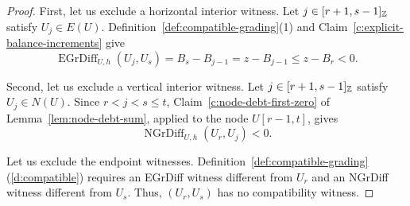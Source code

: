 \begin{proof}
First, let us exclude a horizontal interior witness.
Let $j\in[r+1,s-1]_{\mathbb Z}$ satisfy $U_j\in E(U)$.
Definition~\ref{def:compatible-grading}(1) and Claim~\ref{c:explicit-balance-increments} give
\[
 \operatorname{EGrDiff}_{U,h}(U_j,U_s)
 =B_s-B_{j-1}=z-B_{j-1}\le z-B_r<0.
\]

Second, let us exclude a vertical interior witness.
Let $j\in[r+1,s-1]_{\mathbb Z}$ satisfy $U_j\in N(U)$.
Since $r<j<s\le t$, Claim~\ref{c:node-debt-first-zero} of
Lemma~\ref{lem:node-debt-sum}, applied to the node $U[r-1,t]$, gives
\[
 \operatorname{NGrDiff}_{U,h}(U_r,U_j)<0.
\]

Let us exclude the endpoint witnesses.
Definition~\ref{def:compatible-grading}(\ref{d:compatible}) requires an
EGrDiff witness different from $U_r$ and an NGrDiff witness different from $U_s$.
Thus, $(U_r,U_s)$ has no compatibility witness.
\end{proof}

